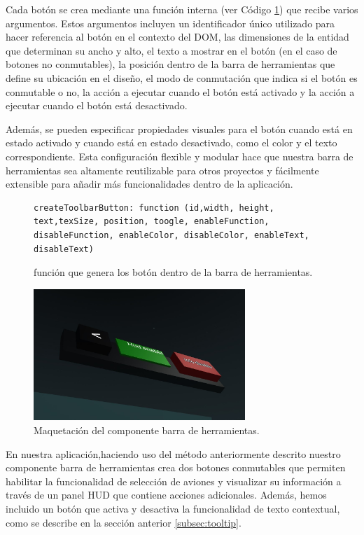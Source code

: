 \documentclass[a4paper, 11pt]{book}
\begin{document}
Cada botón se crea mediante una función interna (ver Código \ref{codigo:crearBoton}) que recibe varios argumentos. Estos argumentos incluyen un identificador único utilizado para hacer referencia al botón en el contexto del DOM, las dimensiones de la entidad que determinan su ancho y alto, el texto a mostrar en el botón (en el caso de botones no conmutables), la posición dentro de la barra de herramientas que define su ubicación en el diseño, el modo de conmutación que indica si el botón es conmutable o no, la acción a ejecutar cuando el botón está activado y la acción a ejecutar cuando el botón está desactivado.

Además, se pueden especificar propiedades visuales para el botón cuando está en estado activado y cuando está en estado desactivado, como el color y el texto correspondiente. Esta configuración flexible y modular hace que nuestra barra de herramientas sea altamente reutilizable para otros proyectos y fácilmente extensible para añadir más funcionalidades dentro de la aplicación.
\begin{figure}[H]
\centering
\begin{verbatim}
createToolbarButton: function (id,width, height, text,texSize, position, toogle, enableFunction, disableFunction, enableColor, disableColor, enableText, disableText)
\end{verbatim}
\caption{función que genera los botón dentro de la barra de herramientas.
\label{codigo:crearBoton}
}
\end{figure}
\begin{figure}[H]
  \centering
  \includegraphics[width=8cm, keepaspectratio]{img/toolbarElementos.jpg}
  \caption{Maquetación del componente barra de herramientas.}
  \label{fig:toolbarComposition}
\end{figure}

En nuestra aplicación,haciendo uso del método anteriormente descrito nuestro componente barra de herramientas crea dos botones conmutables que permiten habilitar la funcionalidad de selección de aviones y visualizar su información a través de un panel HUD que contiene acciones adicionales. Además, hemos incluido un botón que activa y desactiva la funcionalidad de texto contextual, como se describe en la sección anterior \ref{subsec:tooltip}.
\end{document}
